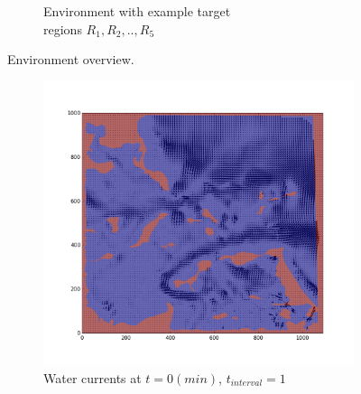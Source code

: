 \documentclass{tamuccthesis}
\begin{document}
\begin{figure}
\begin{subfigure}[b]{0.475\textwidth}
        \caption{{\small Environment with example target \\ regions $R_1, R_2, .., R_5$}}   
        \label{fig:env_targets}
    \end{subfigure}
    \caption[Environment overview.]{Environment overview.}
    \label{fig:env}
\end{figure}

\begin{figure}
    \captionsetup{justification=centering}
    \centering
    \begin{subfigure}[b]{0.475\textwidth}
        \centering
        \includegraphics[width=\textwidth,trim={3cm 3cm 3cm 3cm},clip]{Fig_currentsMap-1.png}
        \caption{{\small Water currents at $t = 0 (min)$, $t_{interval} = 1$}}    
        \label{fig:currents_interval_1}
    \end{subfigure}
    \hfill
    \begin{subfigure}[b]{0.475\textwidth}  
        \centering 

\end{subfigure}
\end{figure}
\end{document}
